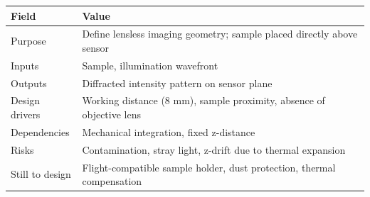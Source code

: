 \begin{longtable}{L{4cm}Y}
\toprule
\textbf{Field} & \textbf{Value} \\
\midrule
Purpose & Define lensless imaging geometry; sample placed directly above sensor \\
Inputs & Sample, illumination wavefront \\
Outputs & Diffracted intensity pattern on sensor plane \\
Design drivers & Working distance (8 mm), sample proximity, absence of objective lens \\
Dependencies & Mechanical integration, fixed z-distance \\
Risks & Contamination, stray light, z-drift due to thermal expansion \\
Still to design & Flight-compatible sample holder, dust protection, thermal compensation \\
\bottomrule
\end{longtable}
